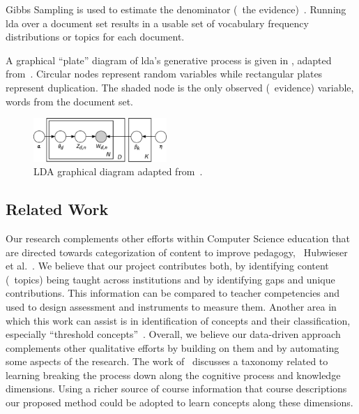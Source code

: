 
\noindent
Gibbs Sampling is used to estimate the denominator (\ie\ the evidence)~\cite{Blei2003}.
Running \ac{lda} over a document set results in a usable set of vocabulary frequency distributions or topics for each document.


A graphical ``plate'' diagram of \ac{lda}'s generative process is given in , adapted from~\cite{Blei2003}.
Circular nodes represent random variables while rectangular plates represent duplication.
The shaded node is the only observed (\ie\ evidence) variable, words from the document set.


\begin{figure}
  \centering
  \includegraphics[width=0.45\textwidth]{figures/lda-plates}
  \caption{LDA graphical diagram adapted from~\cite{Blei2012}\label{fig:lda-plates}.}
\end{figure}


\subsection{Related Work}
\label{sec:related-work}


Our research complements other efforts within Computer Science education that are directed towards categorization of content to improve pedagogy, \eg\ Hubwieser et al.~\cite{hubwieser2013}.
We believe that our project contributes both, by identifying content (\ie\ topics) being taught across institutions and by identifying gaps and unique contributions.
This information can be compared to teacher competencies and used to design assessment and instruments to measure them.
Another area in which this work can assist is in identification of concepts and their classification, especially ``threshold concepts''~\cite{ShinnersKennedyFincher2013}.
Overall, we believe our data-driven approach complements other qualitative efforts by building on them and by automating some aspects of the research.
The work of~\cite{airasian2001taxonomy} discusses a taxonomy related to learning breaking the process down along the cognitive process and knowledge dimensions.
Using a richer source of course information that course descriptions our proposed method could be adopted to learn concepts along these dimensions.

